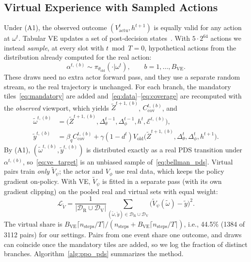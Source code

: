 \documentclass[conference]{IEEEtran}
\newcommand{\om}{\omega}
\newcommand{\omt}{\widetilde{\omega}}
\newcommand{\Vt}{\widetilde{V}}
\newcommand{\Zt}{\widetilde{Z}}
\newcommand{\Vact}{V_{\mathrm{actu}}}
\newcommand{\Ccov}{C_{\mathrm{cov}}}
\newcommand{\Vold}{V_{\mathrm{old}}}
\newcommand{\BVE}{B_{\mathrm{VE}}}
\begin{document}
\subsection{Virtual Experience with Sampled Actions}
\label{sec:ve}
Under (A1), the observed outcome $(\Vact^t,h^{t+1})$ is equally valid for any action at $\om^t$. Tabular VE updates a set of post-decision states~\cite{mastronarde2013joint,sharma2020accelerated,mohammadhosseini2026stochastic}. With $5\cdot2^{64}$ actions we instead \emph{sample}, at every slot with $t\bmod T=0$, hypothetical actions from the distribution already computed for the real action:
\begin{equation}
\alpha^{t,(b)}\sim\pi_{\theta_{\mathrm{old}}}(\cdot|\om^t),\qquad b=1,\dots,\BVE.
\label{eq:ve_sample}
\end{equation}
These draws need no extra actor forward pass, and they use a separate random stream, so the real trajectory is unchanged. For each branch, the mandatory tiles~\eqref{eq:mandatory} are added and~\eqref{eq:data}--\eqref{eq:coverage} are recomputed with the \emph{observed} viewport, which yields $\Zt^{t+1,(b)}$, $\Ccov^{t,(b)}$, and
\begin{align}
\omt^{t,(b)}&=\big(\Zt^{t+1,(b)},\Delta_\theta^{t-1},\Delta_\phi^{t-1},h^t,\mathcal{E}^{t,(b)}\big),\label{eq:ve_pds}\\
\widetilde y^{t,(b)}&=\beta_q\Ccov^{t,(b)}+\gamma(1-d^t)\Vold\big(\Zt^{t+1,(b)},\Delta_\theta^t,\Delta_\phi^t,h^{t+1}\big).\label{eq:ve_target}
\end{align}
By (A1), $(\omt^{t,(b)},\widetilde y^{t,(b)})$ is distributed exactly as a real PDS transition under $\alpha^{t,(b)}$, so~\eqref{eq:ve_target} is an unbiased sample of~\eqref{eq:bellman_pds}. Virtual pairs train \emph{only} $\Vt_\psi$; the actor and $V_\phi$ use real data, which keeps the policy gradient on-policy. With VE, $\Vt_\psi$ is fitted in a separate pass (with its own gradient clipping) on the pooled real and virtual sets with equal weight:
\begin{equation}
\mathcal{L}_{\Vt}=\frac{1}{|\mathcal{D}_{\mathrm R}\cup\mathcal{D}_{\mathrm V}|}\sum_{(\omt,\widetilde y)\in\mathcal{D}_{\mathrm R}\cup\mathcal{D}_{\mathrm V}}\big(\Vt_\psi(\omt)-\widetilde y\big)^2.
\label{eq:ve_loss}
\end{equation}
The virtual share is $\BVE\lceil n_{\mathrm{steps}}/T\rceil/(n_{\mathrm{steps}}+\BVE\lceil n_{\mathrm{steps}}/T\rceil)$, i.e., 44.5\% (1384 of 3112 pairs) for our settings. Pairs from one event share one outcome, and draws can coincide once the mandatory tiles are added, so we log the fraction of distinct branches. Algorithm~\ref{alg:ppo_pds} summarizes the method.
\end{document}
